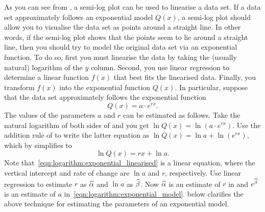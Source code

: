 \documentclass[a4paper,oneside,12pt]{article}
\begin{document}
As you can see from , a
semi-log plot can be used to linearise a data set.  If a data set
approximately follows an exponential model $Q(x)$, a semi-log plot
should allow you to visualise the data set as points around a straight
line.  In other words, if the semi-log plot shows that the points seem
to lie around a straight line, then you should try to model the
original data set via an exponential function.  To do so, first you
must linearise the data by taking the (usually natural) logarithm of
the $y$ column.  Second, you use linear regression to determine a
linear function $f(x)$ that best fits the linearised data.  Finally,
you transform $f(x)$ into the exponential function $Q(x)$.  In
particular, suppose that the data set approximately follows the
exponential function
\begin{equation}
\label{eqn:logarithm:exponential_model}
Q(x)
=
a \cdot e^{rx}.
\end{equation}
The values of the parameters $a$ and $r$ can be estimated as follows.
Take the natural logarithm of both sides of
 and you get
$\ln Q(x) = \ln (a \cdot e^{rx})$.  Use the addition rule of
to write the latter equation as $\ln Q(x) = \ln a + \ln (e^{rx})$,
which by
simplifies to
\begin{equation}
\label{eqn:logarithm:exponential_linearised}
\ln Q(x)
=
rx + \ln a.
\end{equation}
Note that~\eqref{eqn:logarithm:exponential_linearised} is a linear
equation, where the vertical intercept and rate of change are $\ln a$
and $r$, respectively.  Use linear regression to estimate $r$ as
$\widehat{\alpha}$ and $\ln a$ as $\widehat{\beta}$.  Now $\widehat{\alpha}$ is an estimate
of $r$ in  and
$e^{\widehat{\beta}}$ is an estimate of $a$
in~\eqref{eqn:logarithm:exponential_model}.
 below clarifies the above
technique for estimating the parameters of an exponential model.

\begin{table}[!htbp]
\centering

\caption{%
  The total length $x$ versus weight $w$ of $42$ rainbow trout.  Total
  length is measured in millimetres and weight is measured in grams.
  Each $y_i$ is the natural logarithm of $w_i$.  If $\xbar$ and
  $\ybar$ are the means of the $x$ and $y$ columns, respectively, then
  $d(x_i) = x_i - \xbar$ and $d(y_i) = y_i - \ybar$.  The whole table
  shows the detailed calculation necessary for the linear regression
  of the $x$ and $y$ columns.
}
\label{tab:logarithm:rainbow_trout}
\end{table}
\end{document}
